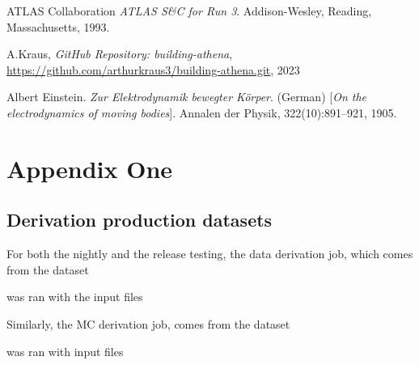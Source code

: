 \documentclass[12pt]{niuthesis}
\begin{document}
\begin{thebibliography}{10}

 ATLAS Collaboration \textit{ATLAS S\&C for Run 3}. Addison-Wesley, Reading, Massachusetts, 1993.


 A.Kraus, \textit{GitHub Repository: building-athena}, \href{https://github.com/arthurkraus3/building-athena.git}{https://github.com/arthurkraus3/building-athena.git}, 2023

 Albert Einstein. \textit{Zur Elektrodynamik bewegter K{\"o}rper}. (German) [\textit{On the electrodynamics of moving bodies}]. Annalen der Physik, 322(10):891–921, 1905.

\end{thebibliography}

\clearpage
\appendix
\chapter{Appendix One}
\section{Derivation production datasets} \label{sec: deriv job dataset}


For both the nightly and the release testing, the data derivation job, which comes from the dataset 



was ran with the input files 



Similarly, the MC derivation job, comes from the dataset 



was ran with input files


\end{document}
